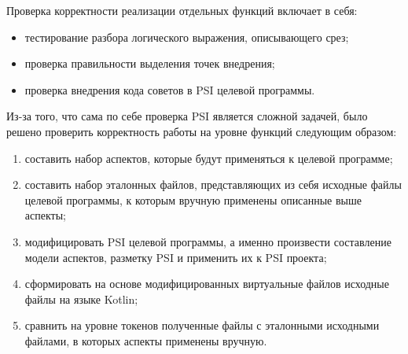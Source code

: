 \documentclass[conference]{IEEEtran}
\begin{document}
Проверка  корректности реализации отдельных функций включает в себя:
\begin{itemize}
    \item тестирование разбора логического выражения, описывающего срез;
    \item проверка правильности выделения точек внедрения;
    \item проверка внедрения кода советов в PSI целевой программы.
\end{itemize}


Из-за того, что сама по себе проверка PSI является сложной задачей, было решено
проверить корректность работы на уровне функций следующим образом:
\begin{enumerate}
    \item составить набор аспектов, которые будут применяться к целевой
          программе;
    \item составить набор эталонных файлов, представляющих из себя исходные
          файлы целевой программы, к которым вручную применены описанные выше
          аспекты;
	\item модифицировать PSI целевой программы, а именно произвести составление
	      модели аспектов, разметку PSI и применить их к PSI проекта;
	\item сформировать на основе  модифицированных виртуальные файлов исходные
	      файлы на языке Kotlin;
	\item сравнить на уровне токенов полученные файлы с эталонными исходными
	      файлами, в которых аспекты применены вручную.		  
\end{enumerate}


\end{document}

